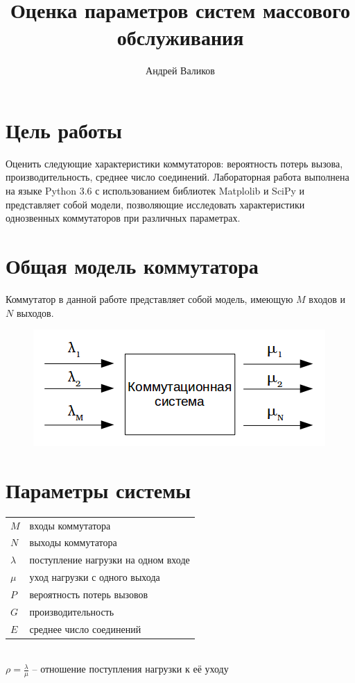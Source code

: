 \documentclass[12pt]{article}
\begin{document}
\title{Оценка параметров систем массового обслуживания}
\author{Андрей Валиков}
\date{}
\maketitle

\section{Цель работы}
Оценить следующие характеристики коммутаторов: вероятность потерь вызова, производительность, среднее число соединений. Лабораторная работа выполнена на языке Python 3.6 с использованием библиотек Matplolib и SciPy и представляет собой модели, позволяющие исследовать характеристики однозвенных коммутаторов при различных параметрах.

\section{Общая модель коммутатора}
Коммутатор в данной работе представляет собой модель, имеющую $M$ входов и $N$ выходов.

\begin{figure}[htp]
\centering
\includegraphics[scale=1.00]{comm_model.png}
\end{figure}


\section{Параметры системы}\label{sec:systemParams}

\begin{tabular}{l l}
    $M$ & входы коммутатора \\
    $N$ & выходы коммутатора \\
    $\lambda$ & поступление нагрузки на одном входе \\
    $\mu$ & уход нагрузки с одного выхода \\
    $P$ & вероятность потерь вызовов \\
    $G$ & производительность \\
    $E$ & среднее число соединений \\
\end{tabular} \\
    $\rho = \frac{\lambda}{\mu}$ -- отношение поступления нагрузки к её уходу 
\end{document}
